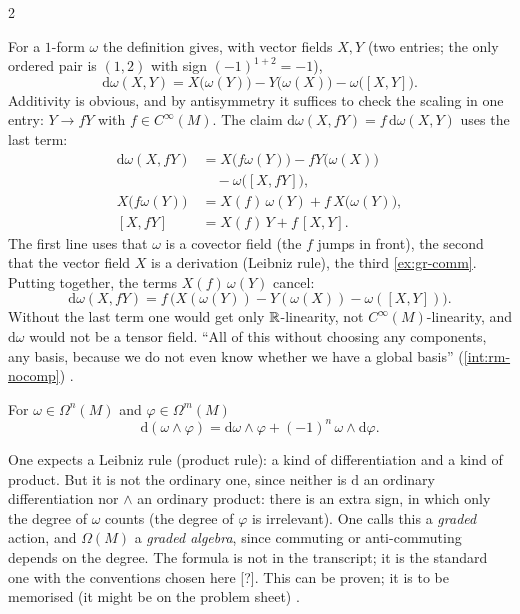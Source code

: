 \begin{paracol}{2}
\begin{example}[The case $n=1$, checked without components]\label{ex:gr-d1}
For a $1$-form $\omega$ the definition gives, with vector fields $X,Y$ (two entries; the only ordered pair is $(1,2)$ with sign $(-1)^{1+2}=-1$),
\[
  \mathrm d\omega(X,Y)=X\bigl(\omega(Y)\bigr)-Y\bigl(\omega(X)\bigr)-\omega\bigl([X,Y]\bigr).
\]
Additivity is obvious, and by antisymmetry it suffices to check the scaling in one entry: $Y\to fY$ with $f\in C^\infty(M)$. The claim $\mathrm d\omega(X,fY)=f\,\mathrm d\omega(X,Y)$ uses the last term:
\[
  \begin{aligned}
  \mathrm d\omega(X,fY)&=X\bigl(f\omega(Y)\bigr)-fY\bigl(\omega(X)\bigr)\\
  &\quad-\omega\bigl([X,fY]\bigr),\\
  X\bigl(f\omega(Y)\bigr)&=X(f)\,\omega(Y)+f\,X\bigl(\omega(Y)\bigr),\\
  [X,fY]&=X(f)\,Y+f\,[X,Y].
  \end{aligned}
\]
The first line uses that $\omega$ is a covector field (the $f$ jumps in front), the second that the vector field $X$ is a derivation (Leibniz rule), the third \cref{ex:gr-comm}. Putting together, the terms $X(f)\,\omega(Y)$ cancel:
\[
  \mathrm d\omega(X,fY)=f\,\bigl(X(\omega(Y))-Y(\omega(X))-\omega([X,Y])\bigr).
\]
Without the last term one would get only $\mathbb{R}$-linearity, not $C^\infty(M)$-linearity, and $\mathrm d\omega$ would not be a tensor field. ``All of this without choosing any components, any basis, because we do not even know whether we have a global basis'' (\cref{int:rm-nocomp})
                   .
\end{example}

\begin{theorem}\label{thm:gr-leibniz}
For $\omega\in\Omega^n(M)$ and $\varphi\in\Omega^m(M)$
\[
  \mathrm d(\omega\wedge\varphi)=\mathrm d\omega\wedge\varphi+(-1)^n\,\omega\wedge\mathrm d\varphi.
\]
    
\end{theorem}
One expects a Leibniz rule (product rule): a kind of differentiation and a kind of product. But it is not the ordinary one, since neither is $\mathrm d$ an ordinary differentiation nor $\wedge$ an ordinary product: there is an extra sign, in which only the degree of $\omega$ counts (the degree of $\varphi$ is irrelevant). One calls this a \emph{graded} action, and $\Omega(M)$ a \emph{graded algebra},
since commuting or anti-commuting depends on the degree. The formula is not in the transcript; it is the standard one with the conventions chosen here [?]. This can be proven; it is to be memorised (it might be on the problem sheet)   .


\end{paracol}

